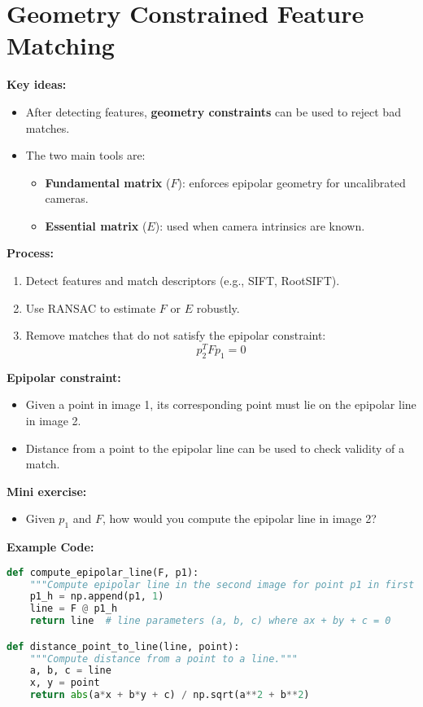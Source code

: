 \documentclass[a4paper,11pt]{article}
\begin{document}
\newpage
\section{Geometry Constrained Feature Matching}

\textbf{Key ideas:}
\begin{itemize}
    \item After detecting features, \textbf{geometry constraints} can be used to reject bad matches.
    \item The two main tools are:
    \begin{itemize}
        \item \textbf{Fundamental matrix} ($F$): enforces epipolar geometry for uncalibrated cameras.
        \item \textbf{Essential matrix} ($E$): used when camera intrinsics are known.
    \end{itemize}
\end{itemize}

\textbf{Process:}
\begin{enumerate}
    \item Detect features and match descriptors (e.g., SIFT, RootSIFT).
    \item Use RANSAC to estimate $F$ or $E$ robustly.
    \item Remove matches that do not satisfy the epipolar constraint:
    \[
    p_2^T F p_1 = 0
    \]
\end{enumerate}

\textbf{Epipolar constraint:}
\begin{itemize}
    \item Given a point in image 1, its corresponding point must lie on the epipolar line in image 2.
    \item Distance from a point to the epipolar line can be used to check validity of a match.
\end{itemize}

\textbf{Mini exercise:}
\begin{itemize}
    \item Given $p_1$ and $F$, how would you compute the epipolar line in image 2?
\end{itemize}

\vspace{1em}

\textbf{Example Code:}
\begin{lstlisting}[language=Python]
def compute_epipolar_line(F, p1):
    """Compute epipolar line in the second image for point p1 in first image."""
    p1_h = np.append(p1, 1)
    line = F @ p1_h
    return line  # line parameters (a, b, c) where ax + by + c = 0

def distance_point_to_line(line, point):
    """Compute distance from a point to a line."""
    a, b, c = line
    x, y = point
    return abs(a*x + b*y + c) / np.sqrt(a**2 + b**2)
\end{lstlisting}
\end{document}
